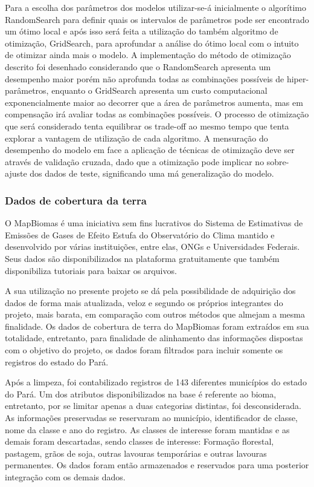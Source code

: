 Para a escolha dos parâmetros dos modelos utilizar-se-á inicialmente o algorítimo RandomSearch para definir quais os intervalos de parâmetros pode ser encontrado um ótimo local e após isso será feita a utilização do também algoritmo de otimização, GridSearch, para aprofundar a análise do ótimo local com o intuito de otimizar ainda mais o modelo. A implementação do método de otimização descrito foi desenhado considerando que o RandomSearch apresenta um desempenho maior porém não aprofunda todas as combinações possíveis de hiper-parâmetros, enquanto o GridSearch apresenta um custo computacional exponencialmente maior ao decorrer que a área de parâmetros aumenta, mas em compensação irá avaliar todas as combinações possíveis. O processo de otimização que será considerado tenta equilibrar os trade-off ao mesmo tempo que tenta explorar a vantagem de utilização de cada algoritmo. A mensuração do desempenho do modelo em face a aplicação de técnicas de otimização deve ser através de validação cruzada, dado que a otimização pode implicar no sobre-ajuste dos dados de teste, significando uma má generalização do modelo.


\subsubsection{Dados de cobertura da terra}

O MapBiomas é uma iniciativa sem fins lucrativos do Sistema de Estimativas de Emissões de Gases de Efeito Estufa do Observatório do Clima mantido e desenvolvido por várias instituições, entre elas, ONGs e Universidades Federais. Seus dados são disponibilizados na plataforma gratuitamente que também disponibiliza tutoriais para baixar os arquivos. 

A sua utilização no presente projeto se dá pela possibilidade de adquirição dos dados de forma mais atualizada, veloz e segundo os próprios integrantes do projeto, mais barata, em comparação com outros métodos que almejam a mesma finalidade. Os dados de cobertura de terra do MapBiomas foram extraídos em sua totalidade, entretanto, para finalidade de alinhamento das informações dispostas com o objetivo do projeto, os dados foram filtrados para incluir somente os registros do estado do Pará. 

Após a limpeza, foi contabilizado registros de 143 diferentes municípios do estado do Pará. Um dos atributos disponibilizados na base é referente ao bioma, entretanto, por se limitar apenas a duas categorias distintas, foi desconsiderada. As informações preservadas se reservaram ao município, identificador de classe, nome da classe e ano do registro. As classes de interesse foram mantidas e as demais foram descartadas, sendo classes de interesse: Formação florestal, pastagem, grãos de soja, outras lavouras temporárias e outras lavouras permanentes. Os dados foram então armazenados e reservados para uma posterior integração com os demais dados.

